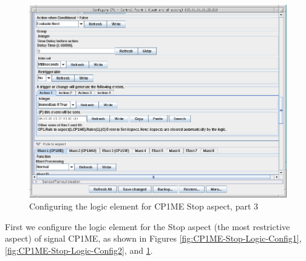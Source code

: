 \begin{figure}[hbpt]\begin{centering}%
\includegraphics[width=5in]{CP1ME-Stop-Logic-Config3.png}
\caption{Configuring the logic element for CP1ME Stop aspect, part 3}
\label{fig:CP1ME-Stop-Logic-Config3}
\end{centering}\end{figure}
First we configure the logic element for the Stop aspect (the most restrictive 
aspect) of signal CP1ME, as shown in Figures 
\ref{fig:CP1ME-Stop-Logic-Config1}, \ref{fig:CP1ME-Stop-Logic-Config2}, and 
\ref{fig:CP1ME-Stop-Logic-Config3}.

